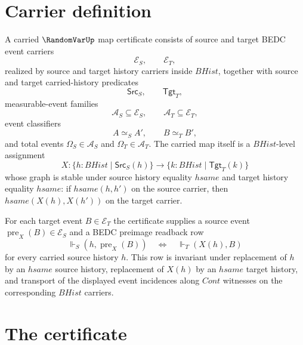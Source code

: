 \section{Carrier definition}
\label{sec:randomvar-carrier}

\begin{definition}
\label{def:randomvar-carried-map-certificate}
A carried $\RandomVarUp$ map certificate consists of source and target BEDC event carriers
$$
\mathcal E_S,\qquad \mathcal E_T,
$$
realized by source and target history carriers inside $BHist$, together with source and target carried-history predicates
$$
\mathsf{Src}_S,\qquad \mathsf{Tgt}_T,
$$
measurable-event families
$$
\mathcal A_S\subseteq\mathcal E_S,\qquad \mathcal A_T\subseteq\mathcal E_T,
$$
event classifiers
$$
A\simeq_S A',\qquad B\simeq_T B',
$$
and total events $\Omega_S\in\mathcal A_S$ and $\Omega_T\in\mathcal A_T$. The carried map itself is a $BHist$-level assignment
$$
X:\{h:BHist\mid \mathsf{Src}_S(h)\}\to \{k:BHist\mid \mathsf{Tgt}_T(k)\}
$$
whose graph is stable under source history equality $hsame$ and target history equality $hsame$: if $hsame(h,h')$ on the source carrier, then $hsame(X(h),X(h'))$ on the target carrier.

For each target event $B\in\mathcal E_T$ the certificate supplies a source event $\operatorname{pre}_X(B)\in\mathcal E_S$ and a BEDC preimage readback row
$$
\Vdash_S(h,\operatorname{pre}_X(B))
\quad\Longleftrightarrow\quad
\Vdash_T(X(h),B)
$$
for every carried source history $h$. This row is invariant under replacement of $h$ by an $hsame$ source history, replacement of $X(h)$ by an $hsame$ target history, and transport of the displayed event incidences along $Cont$ witnesses on the corresponding $BHist$ carriers.
\end{definition}

\section{The certificate}
\label{sec:randomvar-certificate}

